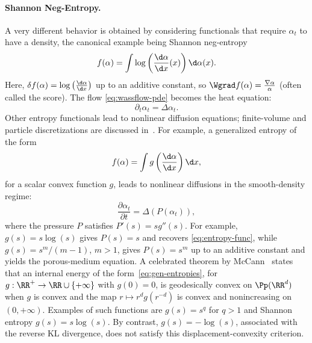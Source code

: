 \paragraph{Shannon Neg-Entropy.}


A very different behavior is obtained by considering functionals that require $\alpha_t$ to have a density, the canonical example being Shannon neg-entropy
   \begin{equation}
       f(\alpha) = \int \log\left(\frac{\d \alpha}{\d x}(x)\right) \d \alpha(x). \label{eq:entropy-func}
   \end{equation}
   Here, $\delta f(\alpha) = \log\left(\frac{\d \alpha}{\d x}\right)$ up to an additive constant, so $\Wgrad f(\alpha) = \frac{\nabla \alpha}{\alpha}$ (often called the score). The flow \eqref{eq:wassflow-pde} becomes the heat equation:
   \begin{equation*}
       \partial_t \alpha_t = \Delta \alpha_t.
   \end{equation*}
   Other entropy functionals lead to nonlinear diffusion equations; finite-volume and particle discretizations are discussed in~\cite{CarrilloFiniteVolume,GianazzaARMA,Maas2011,ErbarHeatManifold}.
%
For example, a generalized entropy of the form
   \begin{equation}\label{eq:gen-entropies}
       f(\alpha) = \int g\left(\frac{\d \alpha}{\d x}\right) \d x,
   \end{equation}
	   for a scalar convex function $g$, leads to nonlinear diffusions in the smooth-density regime:
   \begin{equation*}
       \frac{\partial \alpha_t}{\partial t} = \Delta(P(\alpha_t)),
   \end{equation*}
   where the pressure $P$ satisfies $P'(s)=s g''(s)$. For example, $g(s) = s \log(s)$ gives $P(s)=s$ and recovers \eqref{eq:entropy-func}, while $g(s) = s^m/(m-1)$, $m > 1$, gives $P(s)=s^m$ up to an additive constant and yields the porous-medium equation.
	A celebrated theorem by McCann~\cite{mccann1997convexity} states that an internal energy of the form~\eqref{eq:gen-entropies}, for $g : \RR^+ \to \RR\cup\{+\infty\}$ with $g(0)=0$, is geodesically convex on $\Pp(\RR^d)$ when $g$ is convex and the map $r \mapsto r^d g(r^{-d})$ is convex and nonincreasing on $(0,+\infty)$.
	Examples of such functions are $g(s)=s^q$ for $q>1$ and Shannon entropy $g(s)=s \log(s)$. %
	By contrast, $g(s)=-\log(s)$, associated with the reverse KL divergence, does not satisfy this displacement-convexity criterion.


